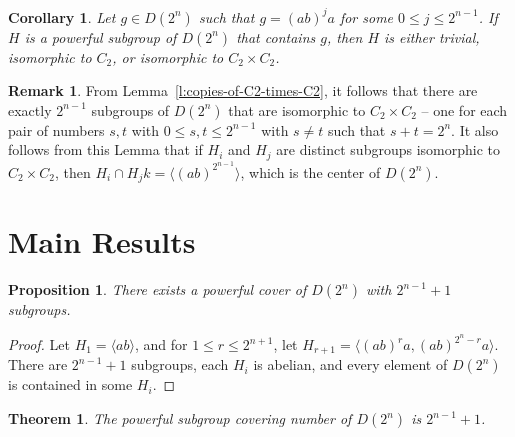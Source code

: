\documentclass{amsart}
\numberwithin{equation} {section}
\newtheorem{theorem}[equation]{Theorem}
\newtheorem{proposition}[equation]{Proposition}
\newtheorem{corollary}[equation]{Corollary}
\theoremstyle{definition}
\newtheorem*{remark}{Remark}
\begin{document}
\begin{corollary}
Let $g \in D(2^n)$ such that $g = (ab)^ja$ for some $0 \leq j \leq 2^{n-1}$. If $H$ is a powerful subgroup of $D(2^n)$ that contains $g$, then $H$ is either trivial, isomorphic to $C_2$, or isomorphic to $C_2 \times C_2$. 
\end{corollary}

\begin{remark}\label{r:count-and-intersection-C2}
From Lemma~\ref{l:copies-of-C2-times-C2}, it follows that there are exactly $2^{n-1}$ subgroups of $D(2^n)$ that are isomorphic to $C_2 \times C_2$ -- one for each pair of numbers $s,t$ with $0 \leq s, t \leq 2^{n-1}$ with $s \neq t$ such that $s+t = 2^n$. It also follows from this Lemma that if $H_i$ and $H_j$ are distinct subgroups isomorphic to $C_2 \times C_2$, then $H_i \cap H_jk = \langle (ab)^{2^{n-1}} \rangle $, which is the center of $D(2^n)$. 
\end{remark}

\section{Main Results}

\begin{proposition}\label{p:upper-bound-covering-number} 
There exists a powerful cover of $D(2^n)$ with $2^{n-1} + 1$ subgroups. 
\end{proposition}

\begin{proof}
Let $H_1 = \langle ab \rangle$, and for $1 \leq r \leq 2^{n+1}$, let $H_{r+1} = \langle (ab)^{r}a, (ab)^{2^n - r}a \rangle$. There are $2^{n-1}+1$ subgroups, each $H_i$ is abelian, and every element of $D(2^n)$ is contained in some $H_i$.  
\end{proof}

\begin{theorem}\label{t:main-result}
The powerful subgroup covering number of $D(2^n)$ is $2^{n-1}+1$.
\end{theorem}
\end{document}
